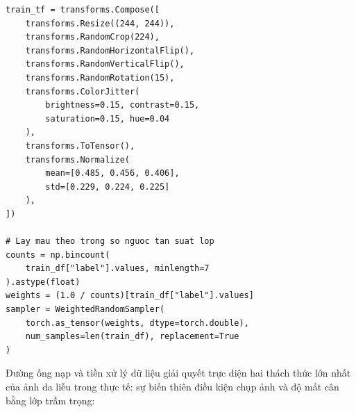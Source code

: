\begin{lstlisting}[caption={Cài đặt Data Augmentation và Weighted Random Sampler}]
train_tf = transforms.Compose([
    transforms.Resize((244, 244)),
    transforms.RandomCrop(224),
    transforms.RandomHorizontalFlip(),
    transforms.RandomVerticalFlip(),
    transforms.RandomRotation(15),
    transforms.ColorJitter(
        brightness=0.15, contrast=0.15,
        saturation=0.15, hue=0.04
    ),
    transforms.ToTensor(),
    transforms.Normalize(
        mean=[0.485, 0.456, 0.406],
        std=[0.229, 0.224, 0.225]
    ),
])

# Lay mau theo trong so nguoc tan suat lop
counts = np.bincount(
    train_df["label"].values, minlength=7
).astype(float)
weights = (1.0 / counts)[train_df["label"].values]
sampler = WeightedRandomSampler(
    torch.as_tensor(weights, dtype=torch.double),
    num_samples=len(train_df), replacement=True
)
\end{lstlisting}
Đường ống nạp và tiền xử lý dữ liệu giải quyết trực diện hai thách thức lớn nhất của ảnh da liễu trong thực tế: sự biến thiên điều kiện chụp ảnh và độ mất cân bằng lớp trầm trọng:
